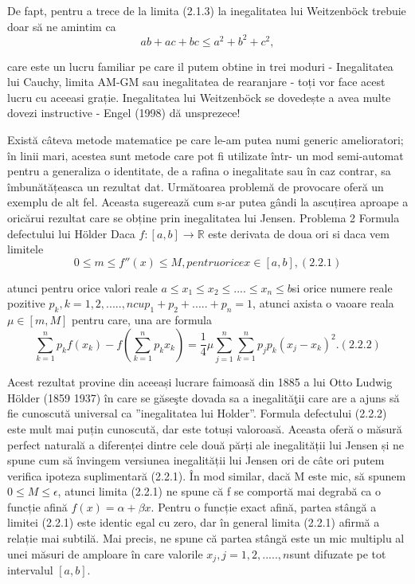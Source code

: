 \documentclass[a4paper,12pt,oneside]{report}
\begin{document}
De fapt, pentru a trece de la limita (2.1.3) la inegalitatea lui Weitzenböck trebuie doar să ne amintim ca 
\begin{displaymath}
  ab + ac + bc \leq a^{2} + b^{2} + c^{2}, 
\end{displaymath}

care este un lucru familiar pe care il putem obtine in trei moduri  - Inegalitatea lui Cauchy, limita AM-GM sau inegalitatea de rearanjare -  toți vor face acest lucru cu aceeasi grație.
	Inegalitatea lui Weitzenböck se dovedește a avea multe dovezi instructive - Engel (1998) dă unsprezece! 

Există câteva metode matematice pe care le-am putea numi generic amelioratori; în linii mari, acestea sunt metode care pot fi utilizate într- un mod semi-automat pentru a generaliza o identitate, de a rafina o inegalitate sau în caz contrar, sa îmbunătățeasca un rezultat dat. 
Următoarea problemă de provocare oferă un exemplu de alt fel. Aceasta sugerează cum s-ar putea gândi la ascuțirea aproape a oricărui rezultat care se obține prin inegalitatea lui Jensen.
Problema 2
Formula defectului lui Hölder
Daca \(f : \left [ a,b  \right ] \to \mathbb{R}\) este derivata de doua ori si daca vem limitele 
\begin{displaymath}
  0 \leq m \leq  f''\left ( x \right ) \leq  M , pentru orice x\in \left [ a,b \right ], (2.2.1)
\end{displaymath}

atunci pentru orice valori reale \(a\leq x_{1}\leq x_{2}\leq ....\leq x_{n} \leq b \)si orice numere reale pozitive \(p_{k}, k= 1,2,.....,n  cu p_{1} + p_{2} + .....+ p_{n} = 1\), atunci axista o vaoare reala \(\mu \in \left [ m, M \right ]\) pentru care, una are formula
\begin{displaymath}
  \sum_{k = 1}^{n}p_{k}f\left ( x_{k} \right ) - f\left ( \sum_{k = 1}^{n} p_{k}x_{k}\right ) = \frac{1}{4}\mu \sum_{j = 1}^{n}\sum_{k = 1}^{n}p_{j}p_{k}\left ( x_{j} - x_{k} \right )^{2}. ( 2.2.2)
\end{displaymath}

Acest rezultat provine din aceeași lucrare faimoasă din 1885 a lui Otto Ludwig Hölder (1859 1937) în care se găseşte dovada sa a inegalităţii care are a ajuns să fie cunoscută universal ca ”inegalitatea lui Holder”. Formula defectului (2.2.2) este mult mai puțin cunoscută, dar este totuși valoroasă. Aceasta oferă o măsură perfect naturală a diferenței dintre cele două părți ale inegalității lui Jensen și ne spune cum să învingem versiunea  inegalității lui Jensen ori de câte ori putem verifica ipoteza suplimentară (2.2.1). 
În mod similar, dacă M este mic, să spunem \(0 \leq M \leq \epsilon\), atunci limita (2.2.1) ne spune că f se comportă mai degrabă ca o funcție afină \(f\left ( x \right ) = \alpha  + \beta x\). Pentru o funcție exact afină, partea stângă a limitei (2.2.1) este identic egal cu zero, dar în general limita (2.2.1) afirmă a relație mai subtilă. Mai precis, ne spune că partea stângă este un mic multiplu al unei măsuri de amploare  în care valorile \(x_{j}, j = 1,2,.....,n \)sunt difuzate pe tot intervalul \(\left [ a, b \right ]. \)
\end{document}
